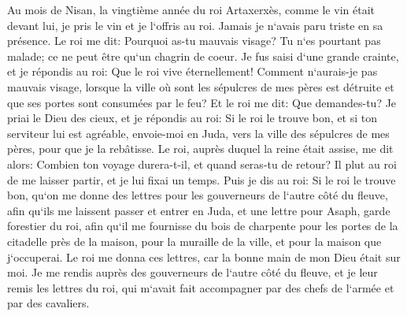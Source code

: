 \verse Au mois de Nisan, la vingtième année du roi Artaxerxès, comme le vin était devant lui, je pris le vin et je l`offris au roi. Jamais je n`avais paru triste en sa présence. 
\verse Le roi me dit: Pourquoi as-tu mauvais visage? Tu n`es pourtant pas malade; ce ne peut être qu`un chagrin de coeur. Je fus saisi d`une grande crainte, 
\verse et je répondis au roi: Que le roi vive éternellement! Comment n`aurais-je pas mauvais visage, lorsque la ville où sont les sépulcres de mes pères est détruite et que ses portes sont consumées par le feu? 
\verse Et le roi me dit: Que demandes-tu? Je priai le Dieu des cieux, 
\verse et je répondis au roi: Si le roi le trouve bon, et si ton serviteur lui est agréable, envoie-moi en Juda, vers la ville des sépulcres de mes pères, pour que je la rebâtisse. 
\verse Le roi, auprès duquel la reine était assise, me dit alors: Combien ton voyage durera-t-il, et quand seras-tu de retour? Il plut au roi de me laisser partir, et je lui fixai un temps. 
\verse Puis je dis au roi: Si le roi le trouve bon, qu`on me donne des lettres pour les gouverneurs de l`autre côté du fleuve, afin qu`ils me laissent passer et entrer en Juda, 
\verse et une lettre pour Asaph, garde forestier du roi, afin qu`il me fournisse du bois de charpente pour les portes de la citadelle près de la maison, pour la muraille de la ville, et pour la maison que j`occuperai. Le roi me donna ces lettres, car la bonne main de mon Dieu était sur moi. 
\verse Je me rendis auprès des gouverneurs de l`autre côté du fleuve, et je leur remis les lettres du roi, qui m`avait fait accompagner par des chefs de l`armée et par des cavaliers. 
